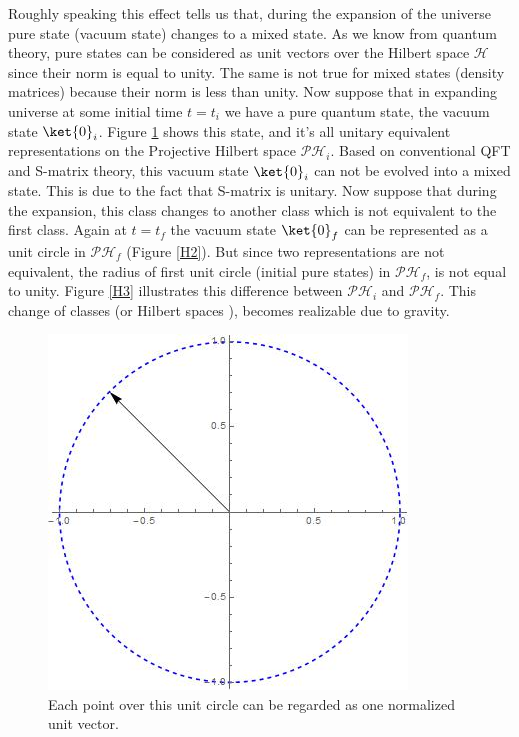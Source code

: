 \documentclass[12pt]{article}
\begin{document}
Roughly speaking this effect tells us that, during the expansion of the universe pure state (vacuum state) changes to a mixed state. As we know from quantum theory, pure states can be considered as unit vectors over the Hilbert space $\mathcal{H}$ since their norm is equal to unity. The same is not true for mixed states (density matrices) because their norm is less than unity.  Now suppose that in expanding universe at some initial time $t=t_i$ we have a pure quantum state, the vacuum state $\ket {0}_i$. Figure \ref{H1}  shows this state, and it's all unitary equivalent representations on the Projective Hilbert space $\mathcal{PH}_i$. Based on conventional QFT and S-matrix theory, this vacuum state $\ket {0}_i$ can not be evolved into a mixed state. This is due to the fact that S-matrix is unitary. Now suppose that during the expansion, this class changes to another class which is not equivalent to the first class. Again at $t=t_f$ the vacuum state  $\ket {0}_f$  can be represented as a unit circle in  $\mathcal{PH}_f$ (Figure \ref{H2}). But since two representations are not equivalent, the radius of first unit circle (initial pure states) in $\mathcal{PH}_f$, is not equal to unity. Figure \ref{H3} illustrates this difference between $\mathcal{PH}_i$ and $\mathcal{PH}_f$. This change of classes (or Hilbert spaces ), becomes realizable due to gravity.   
\begin{figure}
  \includegraphics[width=\linewidth]{Hilbert1.jpg}
  \caption{Each point over this unit circle can be regarded as one normalized unit vector. }
  \label{H1}
\end{figure}
\end{document}
